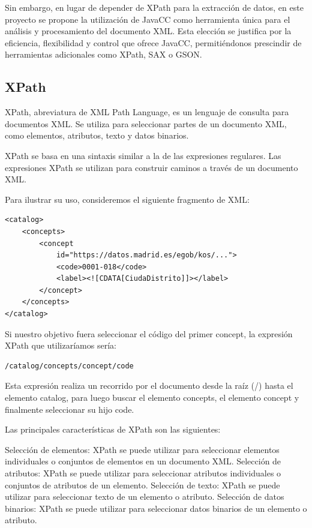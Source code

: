 Sin embargo, en lugar de depender de XPath para la extracción de datos, en este proyecto se propone la utilización de JavaCC como herramienta única para el análisis y procesamiento del documento XML. Esta elección se justifica por la eficiencia, flexibilidad y control que ofrece JavaCC, permitiéndonos prescindir de herramientas adicionales como XPath, SAX o GSON.

\subsection{XPath}

XPath, abreviatura de XML Path Language, es un lenguaje de consulta para documentos XML. Se utiliza para seleccionar partes de un documento XML, como elementos, atributos, texto y datos binarios.

XPath se basa en una sintaxis similar a la de las expresiones regulares. Las expresiones XPath se utilizan para construir caminos a través de un documento XML.

Para ilustrar su uso, consideremos el siguiente fragmento de XML:

\lstset{inputencoding=utf8/latin1}
\begin{lstlisting}
<catalog>
    <concepts>
        <concept
            id="https://datos.madrid.es/egob/kos/...">
            <code>0001-018</code>
            <label><![CDATA[CiudaDistrito]]></label>
        </concept>
    </concepts>
</catalog>

\end{lstlisting}

Si nuestro objetivo fuera seleccionar el código del primer concept, la expresión XPath que utilizaríamos sería:

\lstset{inputencoding=utf8/latin1}
\begin{lstlisting}
/catalog/concepts/concept/code
\end{lstlisting}

Esta expresión realiza un recorrido por el documento desde la raíz (/) hasta el elemento catalog, para luego buscar el elemento concepts, el elemento concept y finalmente seleccionar su hijo code.

Las principales características de XPath son las siguientes:

Selección de elementos: XPath se puede utilizar para seleccionar elementos individuales o conjuntos de elementos en un documento XML.
Selección de atributos: XPath se puede utilizar para seleccionar atributos individuales o conjuntos de atributos de un elemento.
Selección de texto: XPath se puede utilizar para seleccionar texto de un elemento o atributo.
Selección de datos binarios: XPath se puede utilizar para seleccionar datos binarios de un elemento o atributo.


